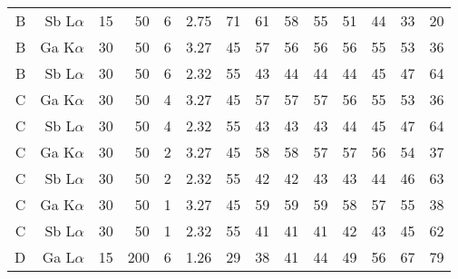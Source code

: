 \begin{table}[phtb]
\begin{center}
\begin{tabular}{rrrrrrrrrrrrrr}
            B            & Sb L$\alpha$  & 15             & 50             & 6           & 2.75              & 71             & 61           & 58            & 55             & 51             & 44             & 33            & 20             \\
            B            & Ga K$\alpha$  & 30             & 50             & 6           & 3.27              & 45             & 57           & 56            & 56             & 56             & 55             & 53            & 36             \\
            B            & Sb L$\alpha$  & 30             & 50             & 6           & 2.32              & 55             & 43           & 44            & 44             & 44             & 45             & 47            & 64             \\
            \hline
            C            & Ga K$\alpha$  & 30             & 50             & 4           & 3.27              & 45             & 57           & 57            & 57             & 56             & 55             & 53            & 36             \\
            C            & Sb L$\alpha$  & 30             & 50             & 4           & 2.32              & 55             & 43           & 43            & 43             & 44             & 45             & 47            & 64             \\
            C            & Ga K$\alpha$  & 30             & 50             & 2           & 3.27              & 45             & 58           & 58            & 57             & 57             & 56             & 54            & 37             \\
            C            & Sb L$\alpha$  & 30             & 50             & 2           & 2.32              & 55             & 42           & 42            & 43             & 43             & 44             & 46            & 63             \\
            C            & Ga K$\alpha$  & 30             & 50             & 1           & 3.27              & 45             & 59           & 59            & 59             & 58             & 57             & 55            & 38             \\
            C            & Sb L$\alpha$  & 30             & 50             & 1           & 2.32              & 55             & 41           & 41            & 41             & 42             & 43             & 45            & 62             \\
            \hline
            D            & Ga L$\alpha$  & 15             & 200            & 6           & 1.26              & 29             & 38           & 41            & 44             & 49             & 56             & 67            & 79             \\

\end{tabular}
\end{center}
\end{table}
